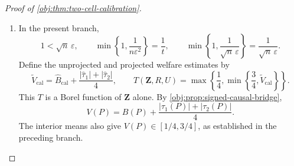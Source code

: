 \begin{proof}[Proof of \cref{obj:thm:two-cell-calibration}]
\begin{enumerate}
Conditional on the records, the transcript atom probability is the product of its participant-specific atom probabilities. Integrating against the product record law from
\cref{obj:ass:iid-people}, and using
\cref{obj:ass:independent-randomness}, gives the transcript identity
\[
\mathbb P\{\mathbf Z=((h_i,z_i))_{i=1}^{n}\}
=
\prod_{i=1}^{n}
\int Q_i(\{(h_i,z_i)\}\mid o)\,P_O(do).
\]
Thus distinct message rows are independent under the sampling decision law.

For \(i\le m_{\mathrm{bin}}\), direct summation over the binary message gives
\[
\mathbb E[\mathsf H_i^{\mathrm{cal}}\mid O_i]
=\delta(2Y_i-1),
\qquad
\mathbb E[\mathsf H_i^{\mathrm{cal}}]
=\delta(2B(P)-1),
\qquad
\mathbb E[(\mathsf H_i^{\mathrm{cal}})^2]=1.
\]
It follows that
\[
\mathbb E[\widehat B_{\mathrm{cal}}]=B(P),
\qquad
\operatorname{Var}\left(
\sum_{i=1}^{m_{\mathrm{bin}}}\mathsf H_i^{\mathrm{cal}}
\right)
=
\sum_{i=1}^{m_{\mathrm{bin}}}
\operatorname{Var}(\mathsf H_i^{\mathrm{cal}})
\le m_{\mathrm{bin}}.
\]
Scaling this centered sum proves
\[
\mathbb E[(\widehat B_{\mathrm{cal}}-B(P))^2]
\le\frac1{4m_{\mathrm{bin}}\delta^2}.
\]

For the vector block, \cref{obj:lem:private-moment-and-dependence} supplies
\[
\mathbb E[W_{ij}^{\mathrm{cal}}]=\tau_j(P),
\qquad
\mathbb E[(W_{ij}^{\mathrm{cal}})^2]=b^2.
\]
The hypotheses of that result hold with block size \(m_{\mathrm{vec}}\), since
\(0<m_{\mathrm{vec}}\le n\), \(d=2\), and \(P\in\mathcal V_2\).
Expanding the squared column sum and using independence of distinct rows yields, for each \(j\in[2]\),
\[
\begin{aligned}
\mathbb E[\widehat\tau_j]
&=\tau_j(P),\\
\mathbb E[\widehat\tau_j^2]
&=\frac{
m_{\mathrm{vec}}b^2+
m_{\mathrm{vec}}(m_{\mathrm{vec}}-1)\tau_j(P)^2
}{m_{\mathrm{vec}}^2}
=\tau_j(P)^2+
\frac{b^2-\tau_j(P)^2}{m_{\mathrm{vec}}}.
\end{aligned}
\]
Subtracting the squared mean therefore gives
\[
\mathbb E[(\widehat\tau_j-\tau_j(P))^2]
=
\frac{b^2-\tau_j(P)^2}{m_{\mathrm{vec}}}
\le\frac{b^2}{m_{\mathrm{vec}}}
=\frac4{m_{\mathrm{vec}}\delta^2}.
\]
All three statistics are Borel functions of the finite transcript alone. These are the required component bounds, simultaneously for every \(P\in\mathcal V_2\).

\item
In the present branch,
\[
1<\sqrt n\,\varepsilon,
\qquad
\min\left\{1,\frac1{n\varepsilon^2}\right\}
=\frac1t,
\qquad
\min\left\{1,\frac1{\sqrt n\,\varepsilon}\right\}
=\frac1{\sqrt n\,\varepsilon}.
\]
Define the unprojected and projected welfare estimates by
\[
\widetilde V_{\mathrm{cal}}
=\widehat B_{\mathrm{cal}}
+\frac{|\widehat\tau_1|+|\widehat\tau_2|}{4},
\qquad
T(\mathbf Z,R,U)
=\max\left\{\frac14,
\min\left\{\frac34,\widetilde V_{\mathrm{cal}}\right\}\right\}.
\]
This \(T\) is a Borel function of \(\mathbf Z\) alone.
By \cref{obj:prop:signed-causal-bridge},
\[
V(P)=B(P)+\frac{|\tau_1(P)|+|\tau_2(P)|}{4}.
\]
The interior means also give \(V(P)\in[1/4,3/4]\), as established in the preceding branch.


\end{enumerate}
\end{proof}

